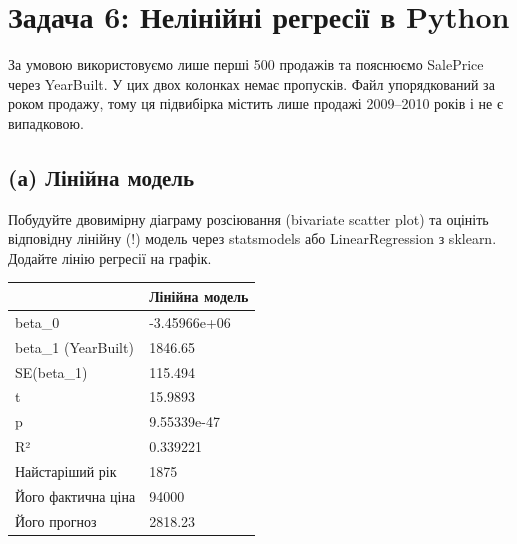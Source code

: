 \clearpage

\section{Задача 6: Нелінійні регресії в Python}


За умовою використовуємо лише перші 500 продажів та пояснюємо SalePrice
через YearBuilt. У цих двох колонках немає пропусків. Файл упорядкований
за роком продажу, тому ця підвибірка містить лише продажі 2009--2010
років і не є випадковою.


\Needspace{186.0pt}

\subsection{(а) Лінійна модель}

\begin{taskstatement}
Побудуйте двовимірну діаграму розсіювання (bivariate scatter plot) та
оцініть відповідну лінійну (!) модель через statsmodels або
LinearRegression з sklearn. Додайте лінію регресії на графік.
\end{taskstatement}



\Needspace{65.19999999999999pt}


\begingroup\fontsize{7.5}{9.5}\selectfont\setlength{\tabcolsep}{2.5mm}\renewcommand{\arraystretch}{1.15}
\par\vspace{2pt}\noindent\begin{tabular}{|ll|}
\hline
 & Лінійна модель \\
\hline
beta\_0 & -3.45966e+06 \\
beta\_1 (YearBuilt) & 1846.65 \\
SE(beta\_1) & 115.494 \\
t & 15.9893 \\
p & 9.55339e-47 \\
R² & 0.339221 \\
Найстаріший рік & 1875 \\
Його фактична ціна & 94000 \\
Його прогноз & 2818.23 \\
\hline
\end{tabular}\par\vspace{2pt}
\endgroup


